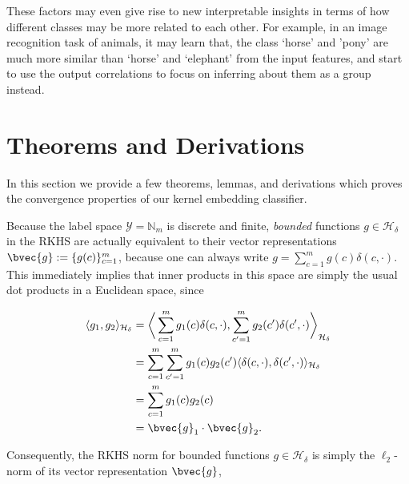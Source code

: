 \documentclass{article}
\begin{document}
\begin{itemize}
		These factors may even give rise to new interpretable insights in terms of how different classes may be more related to each other. For example, in an image recognition task of animals, it may learn that, the class `horse' and 'pony' are much more similar than `horse' and `elephant' from the input features, and start to use the output correlations to focus on inferring about them as a group instead.
		\end{itemize}
	
\small



\newpage
\appendix

\section{Theorems and Derivations}
\label{app:theorems_derivations}

	In this section we provide a few theorems, lemmas, and derivations which proves the convergence properties of our kernel embedding classifier.
	
	Because the label space $\mathcal{Y} = \mathbb{N}_{m}$ is discrete and finite, \textit{bounded} functions $g \in \mathcal{H}_{\delta}$ in the RKHS are actually equivalent to their vector representations $\bvec{g} := \{g(c)\}_{c = 1}^{m}$, because one can always write $g = \sum_{c = 1}^{m} g(c) \delta(c, \cdot)$. This immediately implies that inner products in this space are simply the usual dot products in a Euclidean space, since
	
	\begin{equation}
	\begin{aligned}
			\langle g_{1}, g_{2} \rangle_{\mathcal{H}_{\delta}} &= \bigg\langle \sum_{c = 1}^{m} g_{1}(c) \delta(c, \cdot), \sum_{c' = 1}^{m} g_{2}(c') \delta(c', \cdot)  \bigg\rangle_{\mathcal{H}_{\delta}} \\
			&= \sum_{c = 1}^{m} \sum_{c' = 1}^{m} g_{1}(c) g_{2}(c') \langle \delta(c, \cdot), \delta(c', \cdot) \rangle_{\mathcal{H}_{\delta}} \\
			&= \sum_{c = 1}^{m} g_{1}(c) g_{2}(c) \\
			&= \bvec{g}_{1} \cdot \bvec{g}_{2}.
	\end{aligned}
	\end{equation}
	
	Consequently, the RKHS norm for bounded functions $g \in \mathcal{H}_{\delta}$ is simply the $\ell_{2}$-norm of its vector representation $\bvec{g}$,
	
\end{document}
